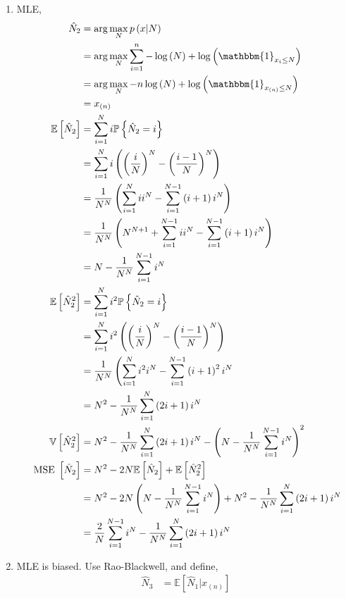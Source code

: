 \documentclass{article}
\begin{document}
\begin{enumerate}
\item MLE,
\begin{align*}
\hat{N}_{2} &= \arg\displaystyle\max_{N} p\left(x | N \right)
\\ &= \arg\displaystyle\max_{N} \displaystyle\sum_{i=1}^{n} - \log\left(N\right) + \log\left(\mathbbm{1}_{x_{i} \leq  N}\right)
\\ &= \arg\displaystyle\max_{N} - n \log\left(N\right) + \log\left(\mathbbm{1}_{x_{\left(n\right)} \leq  N}\right)
\\ &= x_{\left(n\right)}
\\ \mathbb{E}\left[\hat{N}_{2}\right] &= \displaystyle\sum_{i=1}^{N} i \mathbb{P}\left\{\hat{N}_{2} = i\right\}
\\ &= \displaystyle\sum_{i=1}^{N} i \left(\left(\dfrac{i}{N}\right)^{N} - \left(\dfrac{i-1}{N}\right)^{N}\right)
\\ &= \dfrac{1}{N^{N}} \left(\displaystyle\sum_{i=1}^{N} i i^{N} - \displaystyle\sum_{i=1}^{N-1} \left(i+1\right) i^{N}\right)
\\ &= \dfrac{1}{N^{N}} \left(N^{N+1} + \displaystyle\sum_{i=1}^{N-1} i i^{N} - \displaystyle\sum_{i=1}^{N-1} \left(i+1\right) i^{N}\right)
\\ &= N  - \dfrac{1}{N^{N}} \displaystyle\sum_{i=1}^{N-1} i^{N}
\\ \mathbb{E}\left[\hat{N}_{2}^{2}\right] &= \displaystyle\sum_{i=1}^{N} i^{2} \mathbb{P}\left\{\hat{N}_{2} = i\right\}
\\ &= \displaystyle\sum_{i=1}^{N} i^{2} \left(\left(\dfrac{i}{N}\right)^{N} - \left(\dfrac{i-1}{N}\right)^{N}\right)
\\ &= \dfrac{1}{N^{N}} \left(\displaystyle\sum_{i=1}^{N} i^{2} i^{N} - \displaystyle\sum_{i=1}^{N-1} \left(i+1\right)^{2} i^{N}\right.
\\ &= N^{2} - \dfrac{1}{N^{N}} \displaystyle\sum_{i=1}^{N} \left(2 i + 1\right) i^{N}
\\ \mathbb{V}\left[\hat{N}_{2}^{2}\right] &= N^{2} - \dfrac{1}{N^{N}} \displaystyle\sum_{i=1}^{N} \left(2 i + 1\right) i^{N} - \left(N  - \dfrac{1}{N^{N}} \displaystyle\sum_{i=1}^{N-1} i^{N}\right)^{2}
\\ \text{\;MSE\;} \left[\hat{N}_{2}\right] &= N^{2} - 2 N \mathbb{E}\left[\hat{N}_{2}\right] + \mathbb{E}\left[\hat{N}_{2}^{2}\right]
\\ &= N^{2} - 2 N \left(N  - \dfrac{1}{N^{N}} \displaystyle\sum_{i=1}^{N-1} i^{N}\right) + N^{2} - \dfrac{1}{N^{N}} \displaystyle\sum_{i=1}^{N} \left(2 i + 1\right) i^{N}
\\ &= \dfrac{2}{N} \displaystyle\sum_{i=1}^{N-1} i^{N} - \dfrac{1}{N^{N}} \displaystyle\sum_{i=1}^{N} \left(2 i + 1\right) i^{N}
\end{align*}
\item MLE is biased.
Use Rao-Blackwell, and define,
\begin{align*}
\hat{N}_{3} &= \mathbb{E}\left[\hat{N}_{1} | x_{\left(n\right)}\right]
\end{align*}
\end{enumerate}
\end{document}
